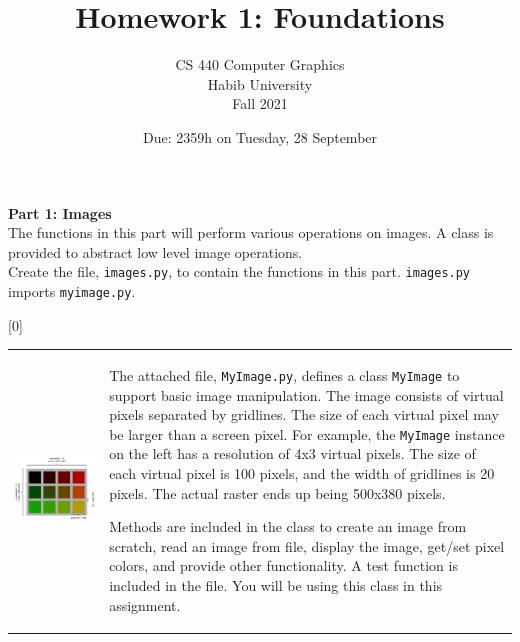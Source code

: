 \documentclass[addpoints]{exam}
\title{Homework 1: Foundations}
\author{CS 440 Computer Graphics\\Habib University\\Fall 2021}
\date{Due: 2359h on Tuesday, 28 September}
\begin{document}
\maketitle

\begin{questions}

  \begin{EnvFullwidth}
    {\Large\bf Part 1: Images}\\

    The functions in this part will perform various operations on images. A class is provided to abstract low level image operations. \\ Create the file, \texttt{images.py}, to contain the functions in this part. \texttt{images.py} imports \texttt{myimage.py}.
  \end{EnvFullwidth}
  

[0]

  \noindent
  \begin{tabularx}{\textwidth}{lX}
    \includegraphics[width=.45\textwidth,align=t]{demo} &

                                                          The attached file, \texttt{MyImage.py}, defines a class \texttt{MyImage} to support basic image manipulation. The image consists of virtual pixels separated by gridlines. The size of each virtual pixel may be larger than a screen pixel. For example, the \texttt{MyImage} instance on the left has a resolution of 4x3 virtual pixels. The size of each virtual pixel is 100 pixels, and the width of gridlines is 20 pixels. The actual raster ends up being 500x380 pixels.

                                                          Methods are included in the class to create an image from scratch, read an image from file, display the image, get/set pixel colors, and provide other functionality. A test function is included in the file. You will be using this class in this assignment.
  \end{tabularx}


\end{questions}
\end{document}
